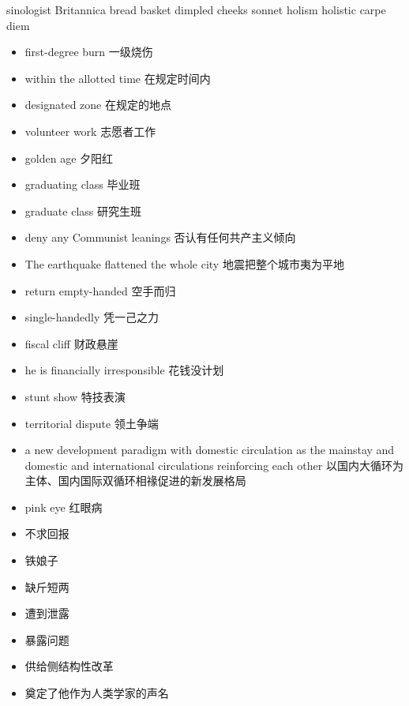 \documentclass{ctexart}
\newif\ifpreface
\begin{document}
\large
\setlength{\baselineskip}{1.2em}
\ifpreface

\else
\maketitle
\fi
{}
sinologist
Britannica
bread basket
dimpled cheeks
sonnet
holism
holistic
carpe diem

\begin{itemize}
  \item first-degree burn 一级烧伤
  \item within the allotted time 在规定时间内
  \item designated zone 在规定的地点
  \item volunteer work 志愿者工作
  \item golden age 夕阳红
  \item graduating class 毕业班
  \item graduate class 研究生班
  \item deny any Communist leanings 否认有任何共产主义倾向
  \item The earthquake flattened the whole city 地震把整个城市夷为平地
  \item return empty-handed 空手而归
  \item single-handedly 凭一己之力
  \item fiscal cliff 财政悬崖
  \item he is financially irresponsible 花钱没计划
  \item stunt show 特技表演
  \item territorial dispute 领土争端
  \item a new development paradigm with domestic circulation as the
    mainstay and domestic and international circulations reinforcing each other
    以国内大循环为主体、国内国际双循环相禒促进的新发展格局
  \item pink eye 红眼病
  \item {} 不求回报
  \item {} 铁娘子
  \item {} 缺斤短两
  \item {} 遭到泄露
  \item {} 暴露问题
  \item {} 供给侧结构性改革
  \item {} 奠定了他作为人类学家的声名

\end{itemize}
\end{document}
